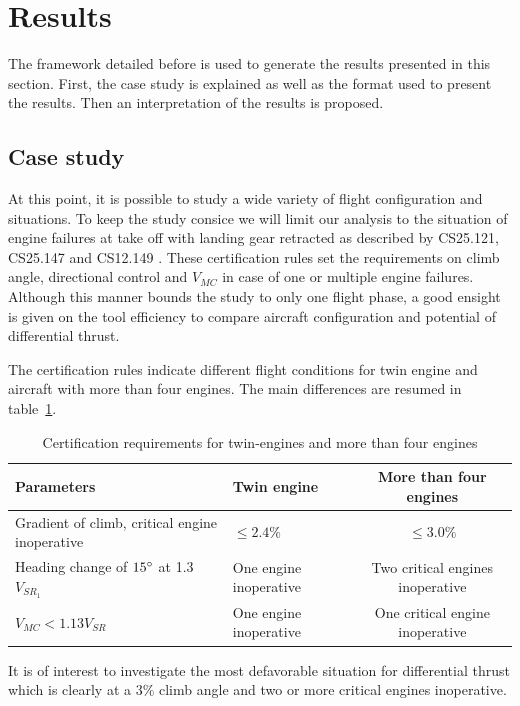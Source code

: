 \section{Results}
The framework detailed before is used to generate the results presented in this section. First, the case study is explained as well as the format used to present the results. Then an interpretation of the results is proposed.

\subsection{Case study}
At this point, it is possible to study a wide variety of flight configuration and situations. To keep the study consice we will limit our analysis to the situation of engine failures at take off with landing gear retracted as described by CS25.121, CS25.147 and CS12.149 \cite{CS25}. These certification rules set the requirements on climb angle, directional control and $V_{MC}$ in case of one or multiple engine failures. Although this manner bounds the study to only one flight phase, a good ensight is given on the tool efficiency to compare aircraft configuration and potential of differential thrust.

The certification rules indicate different flight conditions for twin engine and aircraft with more than four engines. The main differences are resumed in table~\ref{tab:DiffTwinMulti}. %
\begin{table}[hbt]
	\caption{\label{tab:DiffTwinMulti} Certification requirements for twin-engines and more than four engines \cite{CS25}} 
	\centering
	\begin{tabular}{l|l|c}
		Parameters & Twin engine & More than four engines\\
		\hline
		Gradient of climb, critical engine inoperative & $\leq 2.4\%$ & $\leq 3.0\%$\\
		Heading change of $15\degree$ at 1.3$V_{SR_1}$& One engine inoperative & Two critical engines inoperative\\
		$V_{MC} < 1.13 V_{SR}$ & One engine inoperative & One critical engine inoperative \\
	\end{tabular}
\end{table}

It is of interest to investigate the most defavorable situation for differential thrust which is clearly at a $3\%$ climb angle and two or more critical engines inoperative. 

